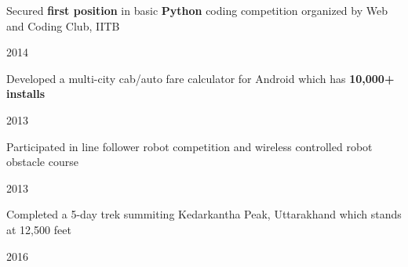 \begin{cvbulletentries}
%
\datedbullet
{ %
    \begin{cvonlybullets}
        \item {Secured \textbf{first position} in basic \textbf{Python} coding competition organized by Web and Coding Club, IITB}
    \end{cvonlybullets}
}
{ %
    \begin{cvnobullets}
        \item{2014}
    \end{cvnobullets}
}
\datedbullet
{ %
    \begin{cvonlybullets}
        \item {Developed a multi-city cab/auto fare calculator for Android which has \textbf{10,000+ installs}}
    \end{cvonlybullets}
}
{ %
    \begin{cvnobullets}
        \item{2013}
    \end{cvnobullets}
}
\datedbullet
{ %
    \begin{cvonlybullets}
        \item {Participated in line follower robot competition and wireless controlled robot obstacle course}
    \end{cvonlybullets}
}
{ %
    \begin{cvnobullets}
        \item{2013}
    \end{cvnobullets}
}
\datedbullet
{ %
    \begin{cvonlybullets}
        \item {Completed a 5-day trek summiting Kedarkantha Peak, Uttarakhand which stands at 12,500 feet}
    \end{cvonlybullets}
}
{ %
    \begin{cvnobullets}
        \item{2016}
    \end{cvnobullets}
}
%
%
\end{cvbulletentries}
